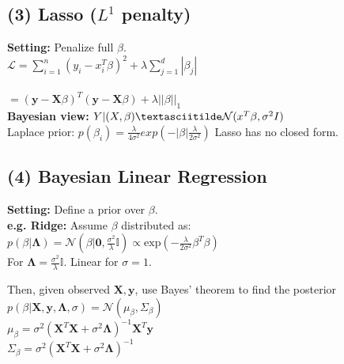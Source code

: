 \subsection*{(3) Lasso ($L^1$ penalty)}
\textbf{Setting:} Penalize full $\beta$.\\
$\mathcal{L} = \sum_{i=1}^n(y_i-x_i^T\beta)^2+\lambda\sum_{j=1}^d|\beta_j| $\\\\
$=(\mathbf{y}-\mathbf{X}\beta)^T(\mathbf{y}-\mathbf{X}\beta)+\lambda||\beta||_1$\\
\textbf{Bayesian view:} $Y|(X, \beta) \textasciitilde \mathcal{N}(x^T\beta, \sigma^2 I)$\\
Laplace prior: $p(\beta_i) = \frac{\lambda}{4\sigma^2} exp(-|\beta|\frac{\lambda}{2\sigma^2})$
Lasso has no closed form.

\subsection*{(4) Bayesian Linear Regression}
\textbf{Setting:} Define a prior over $\beta$.\\
\textbf{e.g. Ridge:} Assume $\beta$ distributed as:\\
$p(\beta|\bm{\bm{\Lambda}}){=}\mathcal{N}(\beta|\mathbf{0},\frac{\sigma^2}{\lambda}\mathbb{I}) \propto \mathrm{exp}(-\frac{\lambda}{2\sigma^2}\beta^T\beta)$\\
For $\bm{\Lambda}=\frac{\sigma^2}{\lambda}\mathbb{I}$. Linear for $\sigma=1$.

Then, given observed $\mathbf{X},\mathbf{y}$, use Bayes' theorem to find the posterior\\
$p(\beta|\mathbf{X},\mathbf{y}, \bm{\Lambda}, \sigma) = \mathcal{N}(\mu_{\beta}, \Sigma_{\beta})$\\
$\mu_\beta = \sigma^2(\mathbf{X}^T\mathbf{X} +\sigma^2\bm{\Lambda})^{-1}\mathbf{X}^T\mathbf{y}$\\
$\Sigma_\beta = \sigma^2(\mathbf{X}^T\mathbf{X} +\sigma^2\bm{\Lambda})^{-1}$

